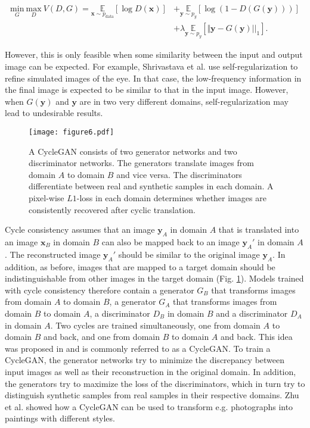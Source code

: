 \documentclass{article}
\begin{document}
\begin{equation}
\begin{split}
\underset{G}{\text{min}}~\underset{D}{\text{max}}~V(D,G)=\underset{\mathbf{x}\sim p_{\text{data}}}{\mathds{E}} [\log{D(\mathbf{x})}] &+\underset{\mathbf{y}\sim p_y}{\mathds{E}} [\log{(1-D(G(\mathbf{y})))}] \\&+\lambda \underset{\mathbf{y}\sim p_y}{\mathds{E}}[\Vert \mathbf{y} - G(\mathbf{y})||_1].
\end{split}
\label{eq:selfreg}
\end{equation}

However, this is only feasible when some similarity between the input and output image can be expected. For example, Shrivastava et al. \cite{shrivastava2017learning} use self-regularization to refine simulated images of the eye. In that case, the low-frequency information in the final image is expected to be similar to that in the input image. However, when $G(\mathbf{y})$ and $\mathbf{y}$ are in two very different domains, self-regularization may lead to undesirable results. 

\begin{figure}[tp]
\centering
\texttt{[image: figure6.pdf]}
\caption{A CycleGAN consists of two generator networks and two discriminator networks. The generators translate images from domain $A$ to domain $B$ and vice versa. The discriminators differentiate between real and synthetic samples in each domain. A pixel-wise $L1$-loss in each domain determines whether images are consistently recovered after cyclic translation.}
\label{fig:cyclegan}
\end{figure}


Cycle consistency assumes that an image $\mathbf{y}_A$ in domain $A$ that is translated into an image $\mathbf{x}_B$ in domain $B$ can also be mapped back to an image $\mathbf{y}_A'$ in domain $A$. The reconstructed image $\mathbf{y}_A'$ should be similar to the original image $\mathbf{y}_A$. In addition, as before, images that are mapped to a target domain should be indistinguishable from other images in the target domain (Fig. \ref{fig:cyclegan}). Models trained with cycle consistency therefore contain a generator $G_B$ that transforms images from domain $A$ to domain $B$, a generator $G_A$ that transforms images from domain $B$ to domain $A$, a discriminator $D_B$ in domain $B$ and a discriminator $D_A$ in domain $A$.  Two cycles are trained simultaneously, one from domain $A$ to domain $B$ and back, and one from domain $B$ to domain $A$ and back. This idea was proposed in \cite{Zhu17,Yi17,Kim17} and is commonly referred to as a CycleGAN. To train a CycleGAN, the generator networks try to minimize the discrepancy between input images as well as their reconstruction in the original domain. In addition, the generators try to maximize the loss of the discriminators, which in turn try to distinguish synthetic samples from real samples in their respective domains. Zhu et al. \cite{Zhu17} showed how a CycleGAN can be used to transform e.g. photographs into paintings with different styles. 
\end{document}
